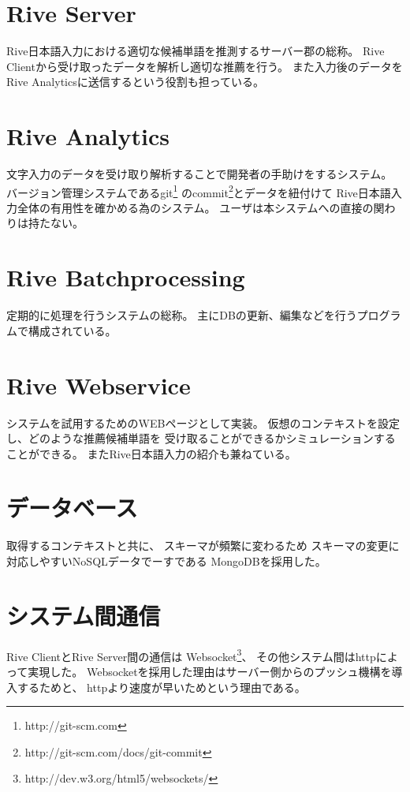 \section{Rive Server}
Rive日本語入力における適切な候補単語を推測するサーバー郡の総称。
Rive Clientから受け取ったデータを解析し適切な推薦を行う。
また入力後のデータをRive Analyticsに送信するという役割も担っている。

\section{Rive Analytics}
文字入力のデータを受け取り解析することで開発者の手助けをするシステム。
バージョン管理システムであるgit\footnote{http://git-scm.com}
のcommit\footnote{http://git-scm.com/docs/git-commit}とデータを紐付けて
Rive日本語入力全体の有用性を確かめる為のシステム。
ユーザは本システムへの直接の関わりは持たない。

\section{Rive Batchprocessing}
定期的に処理を行うシステムの総称。
主にDBの更新、編集などを行うプログラムで構成されている。

\section{Rive Webservice}
システムを試用するためのWEBページとして実装。
仮想のコンテキストを設定し、どのような推薦候補単語を
受け取ることができるかシミュレーションすることができる。
またRive日本語入力の紹介も兼ねている。

\section{データベース}
取得するコンテキストと共に、
スキーマが頻繁に変わるため
スキーマの変更に対応しやすいNoSQLデータでーすである
MongoDBを採用した。

\section{システム間通信}
Rive ClientとRive Server間の通信は
Websocket\footnote{http://dev.w3.org/html5/websockets/}、
その他システム間はhttpによって実現した。
Websocketを採用した理由はサーバー側からのプッシュ機構を導入するためと、
httpより速度が早いためという理由である。\cite{websocket}
